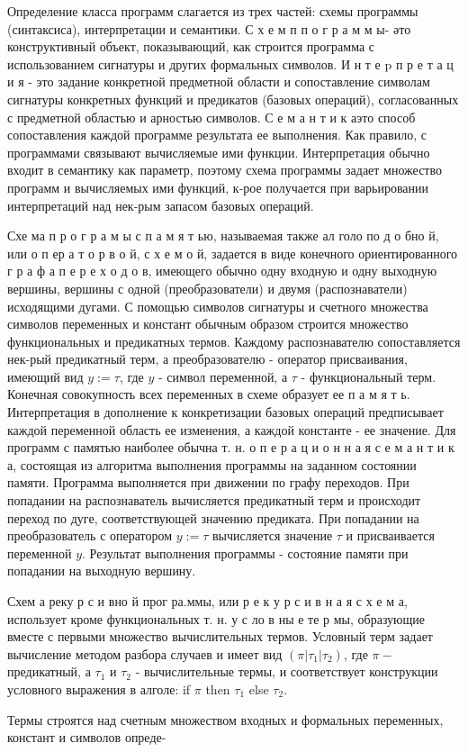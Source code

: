 \documentclass[10pt]{article}
\begin{document}
Определение класса программ слагается из трех частей: схемы программы (синтаксиса), интерпретации и семантики. С х е м п п о г р а м м ы- әто конструктивный объект, показывающий, как строится программа с использованием сигнатуры и других формальных символов. И н т е $\mathrm{p}$ п р е т а ц и я - это задание конкретной предметной области и сопоставление символам сигнатуры конкретных функций и предикатов (базовых операций), согласованных с предметной областью и арностью символов. С е м а н т и к аэто способ сопоставления каждой программе результата ее выполнения. Как правило, с программами связывают вычисляемые ими функции. Интерпретация обычно входит в семантику как параметр, поэтому схема программы задает множество программ и вычисляемых ими функций, к-рое получается при варьировании интерпретаций над нек-рым запасом базовых операций.



Схе ма п р о г р а м ы с п а м я т ью, называемая также ал голо по д о бно й, или о п ер а т о р в о й, с х е м о й, задается в виде конечного ориентированного г р а ф а п е р е х о д о в, имеющего обычно одну входную и одну выходную вершины, вершины с одной (преобразователи) и двумя (распознаватели) исходящими дугами. С помощью символов сигнатуры и счетного множества символов переменных и констант обычным образом строится множество функциональных и предикатных термов. Каждому распознавателю сопоставляется нек-рый предикатный терм, а преобразователю - оператор присваивания, имеющий вид $y:=\tau$, где $y$ - символ переменной, а $\tau$ - функциональный терм. Конечная совокупность всех переменных в схеме образует ее п а м я т ь. Интерпретация в дополнение к конкретизации базовых операций предписывает каждой переменной область ее изменения, а каждой константе - ее значение. Для программ с памятью наиболее обычна т. н. о п е р а ц и о н н а я с е м а н т и к а, состоящая из алгоритма выполнения программы на заданном состоянии памяти. Программа выполняется при движении по графу переходов. При попадании на распознаватель вычисляется предикатный терм и происходит переход по дуге, соответствующей значению предиката. При попадании на преобразователь с оператором $y:=\tau$ вычисляется значение $\tau$ и присваивается переменной $y$. Результат выполнения программы - состояние памяти при попадании на выходную вершину.



Схем а реку р с и вно й прог ра.ммы, или р е к у р с и в н а я с х е м а, использует кроме функциональных т. н. у с ло в ны е те р мы, образующие вместе с первыми множество вычислительных термов. Условный терм задает вычисление методом разбора случаев и имеет вид $\left(\pi\left|\tau_{1}\right| \tau_{2}\right)$, где $\pi-$ предикатный, а $\tau_{1}$ и $\tau_{2}$ - вычислительные термы, и соответствует конструкции условного выражения в алголе: if $\pi$ then $\tau_{1}$ else $\tau_{2}$.



Термы строятся над счетным множеством входных и формальных переменных, констант и символов опреде-
\end{document}
